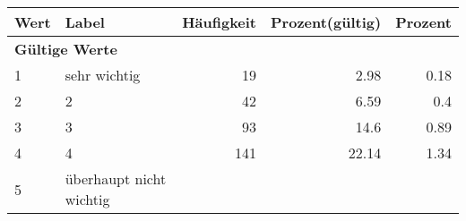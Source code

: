      \begin{longtable}{lXrrr}
     \toprule
     \textbf{Wert} & \textbf{Label} & \textbf{Häufigkeit} & \textbf{Prozent(gültig)} & \textbf{Prozent} \\
     \endhead
     \midrule
     \multicolumn{5}{l}{\textbf{Gültige Werte}}\\

     1 &
     \multicolumn{1}{X}{ sehr wichtig   } &


       \num{19} &
       \num[round-mode=places,round-precision=2]{2,98} &
         \num[round-mode=places,round-precision=2]{0,18} \\

     2 &
     \multicolumn{1}{X}{ 2   } &


       \num{42} &
       \num[round-mode=places,round-precision=2]{6,59} &
         \num[round-mode=places,round-precision=2]{0,4} \\

     3 &
     \multicolumn{1}{X}{ 3   } &


       \num{93} &
       \num[round-mode=places,round-precision=2]{14,6} &
         \num[round-mode=places,round-precision=2]{0,89} \\

     4 &
     \multicolumn{1}{X}{ 4   } &


       \num{141} &
       \num[round-mode=places,round-precision=2]{22,14} &
         \num[round-mode=places,round-precision=2]{1,34} \\

     5 &
     \multicolumn{1}{X}{ überhaupt nicht wichtig   } &



\end{longtable}
